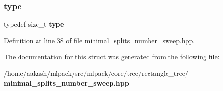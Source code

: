 \subsubsection{type}
{\footnotesize\ttfamily typedef size\+\_\+t \textbf{ type}}



Definition at line 38 of file minimal\+\_\+splits\+\_\+number\+\_\+sweep.\+hpp.



The documentation for this struct was generated from the following file\+:\begin{DoxyCompactItemize}
\item 
/home/aakash/mlpack/src/mlpack/core/tree/rectangle\+\_\+tree/\textbf{ minimal\+\_\+splits\+\_\+number\+\_\+sweep.\+hpp}\end{DoxyCompactItemize}
